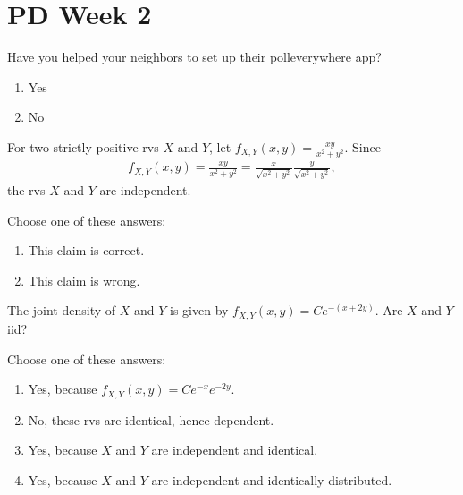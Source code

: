 \documentclass[poll_tutorial_format]{subfiles}
\begin{document}
\section{PD Week 2}


\setcounter{theorem}{-1}
\begin{exercise}
Have you helped your neighbors to set up their polleverywhere app?
\begin{enumerate}
\item Yes
\item No
\end{enumerate}
\end{exercise}



\begin{exercise}
For two strictly positive rvs $X$ and $Y$, let $f_{X,Y}(x, y) = \frac{xy}{x^{2}+y^2}$. Since
\begin{align*}
  f_{X,Y}(x, y) = \frac{xy}{x^{2}+y^2} = \frac{x}{\sqrt{x^{2}+y^2}} \frac{y}{\sqrt{x^{2}+y^2}},
\end{align*}
the rvs $X$ and $Y$ are independent.

Choose one of these answers:
\begin{enumerate}
\item This claim is correct.
\item This claim is wrong.
\end{enumerate}
\end{exercise}



\begin{exercise}
The joint density of $X$ and $Y$ is given by $f_{X,Y}(x,y) = Ce^{-(x + 2y)}$.
Are $X$ and $Y$ iid?

Choose one of these answers:
\begin{enumerate}
\item Yes, because $f_{X,Y}(x, y) = C e^{-x}e^{-2y}$.
\item No,  these rvs are identical, hence dependent.
\item Yes, because $X$ and $Y$ are independent and identical.
\item Yes, because $X$ and $Y$ are independent and identically distributed.
\end{enumerate}
\end{exercise}
\end{document}
